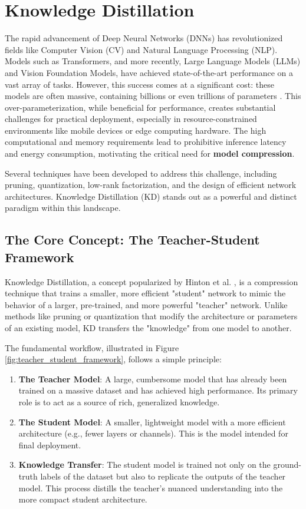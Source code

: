 \section{Knowledge Distillation}
\label{sec:kd_introduction}

The rapid advancement of Deep Neural Networks (DNNs) has revolutionized fields like Computer Vision (CV) and Natural Language Processing (NLP). Models such as Transformers, and more recently, Large Language Models (LLMs) and Vision Foundation Models, have achieved state-of-the-art performance on a vast array of tasks. However, this success comes at a significant cost: these models are often massive, containing billions or even trillions of parameters \cite{Kaplan2020}. This over-parameterization, while beneficial for performance, creates substantial challenges for practical deployment, especially in resource-constrained environments like mobile devices or edge computing hardware. The high computational and memory requirements lead to prohibitive inference latency and energy consumption, motivating the critical need for \textbf{model compression}.

Several techniques have been developed to address this challenge, including pruning, quantization, low-rank factorization, and the design of efficient network architectures. Knowledge Distillation (KD) stands out as a powerful and distinct paradigm within this landscape.

\subsection{The Core Concept: The Teacher-Student Framework}

Knowledge Distillation, a concept popularized by Hinton et al. \cite{Hinton2015}, is a compression technique that trains a smaller, more efficient "student" network to mimic the behavior of a larger, pre-trained, and more powerful "teacher" network. Unlike methods like pruning or quantization that modify the architecture or parameters of an existing model, KD transfers the "knowledge" from one model to another.

The fundamental workflow, illustrated in Figure \ref{fig:teacher_student_framework}, follows a simple principle:
\begin{enumerate}
    \item \textbf{The Teacher Model}: A large, cumbersome model that has already been trained on a massive dataset and has achieved high performance. Its primary role is to act as a source of rich, generalized knowledge.
    \item \textbf{The Student Model}: A smaller, lightweight model with a more efficient architecture (e.g., fewer layers or channels). This is the model intended for final deployment.
    \item \textbf{Knowledge Transfer}: The student model is trained not only on the ground-truth labels of the dataset but also to replicate the outputs of the teacher model. This process distills the teacher's nuanced understanding into the more compact student architecture.
\end{enumerate}

